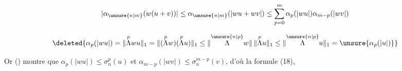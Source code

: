 \[
|\alpha_{\unsure{n|m}}(w(u+v))|\leq\alpha_{\unsure{n|m}}(|wu+wv|)\leq\sum_{p=0}^{m}\alpha_p(|wu|)\alpha_{m-p}(|wv|)
\]


\[
\deleted{\alpha_p(|wu|)=\lVert\overset{p}{\Lambda}wu\rVert_1=\lVert(\overset{p}{\Lambda}w)(\overset{p}{\Lambda}u)\rVert_1\leq\lVert\overset{\unsure{n|p}}{\Lambda}w\rVert\,\lVert\overset{p}{\Lambda}u\rVert_1\leq\lVert\overset{\unsure{n|p}}{\Lambda}u\rVert_1=\unsure{\alpha_p(|u|)}}
\]

 Or () montre que $\alpha_p(|wu|)\leq\sigma_n^p(u)$ et $\alpha_{m-p}(|wv|)\leq\sigma_n^{m-p}(v)$, d'où la formule (18),
